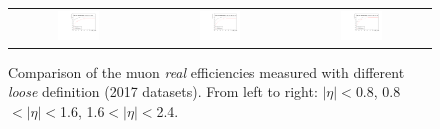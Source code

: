 \begin{figure}[tbh!]
 \begin{center}
 \begin{tabular}{ccc}
 \includegraphics[width=0.32\textwidth]{figures/Part3/Nonprompt/MR/r_muoniso_barrel}&
 \includegraphics[width=0.32\textwidth]{figures/Part3/Nonprompt/MR/r_muoniso_transition}&
 \includegraphics[width=0.32\textwidth]{figures/Part3/Nonprompt/MR/r_muoniso_endcap} \\
 \end{tabular}
 \caption{Comparison of the muon \emph{real} efficiencies measured with different \emph{loose} definition (2017 datasets). From left to right: $|\eta|<$0.8, 0.8$<|\eta|<$1.6, 1.6$<|\eta|<$2.4.}
 \label{fig:r_muoniso}
 \end{center}
\end{figure}

